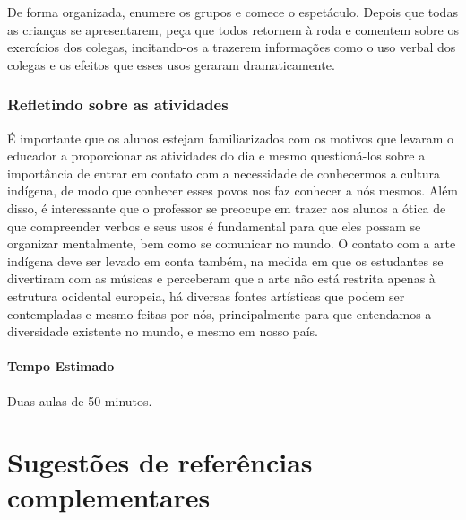 \documentclass[11pt]{extarticle}
\begin{document}


De forma organizada, enumere os grupos e comece o espetáculo. Depois que todas as crianças se apresentarem, peça que todos retornem à roda e comentem sobre os exercícios dos colegas, incitando-os a trazerem informações como o uso verbal dos colegas e os efeitos que esses usos geraram dramaticamente. 



\subsubsection{Refletindo sobre as atividades}


É importante que os alunos estejam familiarizados com os motivos que levaram o educador a proporcionar as atividades do dia e mesmo questioná-los sobre a importância de entrar em contato com a necessidade de conhecermos a cultura indígena, de modo que conhecer esses povos nos faz conhecer a nós mesmos. Além disso, é interessante que o professor se preocupe em trazer aos alunos a ótica de que compreender verbos e seus usos é fundamental para que eles possam se organizar mentalmente, bem como se comunicar no mundo. O contato com a arte indígena deve ser levado em conta também, na medida em que os estudantes se divertiram com as músicas e perceberam que a arte não está restrita apenas à estrutura ocidental europeia, há diversas fontes artísticas que podem ser contempladas e mesmo feitas por nós, principalmente para que entendamos a diversidade existente no mundo, e mesmo em nosso país.

\paragraph{Tempo Estimado} Duas aulas de 50 minutos. 

\section{Sugestões de referências complementares}
\end{document}
